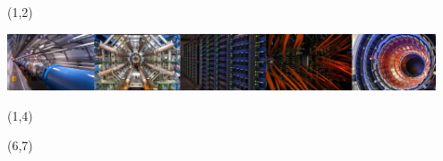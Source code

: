 \documentclass[final]{beamer}
\begin{document}
\begin{frame}{} 




\begin{textblock}{84.0}(1,2)
\begin{center}
{\includegraphics[width=0.95\textwidth]{images/s2i2-banner.jpg}}
\end{center}
\end{textblock}

\begin{textblock}{84.0}(1,4)
\begin{center}
\begin{huge}
\color{white}{
S2I2-HEP - Conceptualization of an S2I2 Institute for High Energy Physics
}
\end{huge}
\end{center}
\end{textblock}

\begin{textblock}{84.0}(6,7)
\begin{center}
\begin{LARGE}
\color{white}{
PIs: Peter Elmer (Princeton U.), Mark Neubauer (U.Illinois Urbana-Champaign), \\ Mike Sokoloff (U.Cincinnati)
}
\end{LARGE}
\end{center}
\end{textblock}


\end{frame}
\end{document}
